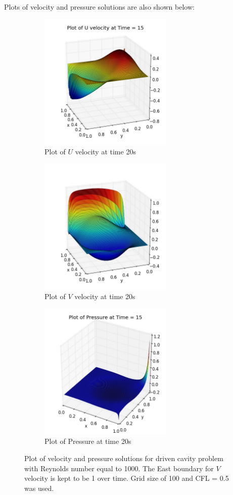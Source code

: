 Plots of velocity and pressure solutions are also shown below:
\begin{figure}[H]
	\centering
	\begin{subfigure}[t]{2.5in}
		\centering
		\includegraphics[width=2.5in]{figures/Gauge_dcv_uf_grid_120.jpg}
		\caption{Plot of $U$ velocity at time 20s}\label{fig:6.19a}		
	\end{subfigure}
	\quad
	\begin{subfigure}[t]{2.5in}
		\centering
		\includegraphics[width=2.5in]{figures/Gauge_dcv_vf_grid_120.jpg}
		\caption{Plot of $V$ velocity at time 20s}\label{fig:6.19b}
	\end{subfigure}
	\quad
	\centering
	\begin{subfigure}[t]{3.5in}
		\centering
		\includegraphics[width=2.5in]{figures/Gauge_dcv_pf_grid_120.jpg}
		\caption{Plot of Pressure at time 20s}\label{fig:6.19a}		
	\end{subfigure}
	\caption{Plot of velocity and pressure solutions for driven cavity problem with Reynolds number equal to 1000. The East boundary for $V$ velocity is kept to be 1 over time. Grid size of 100 and CFL = 0.5 was used.}\label{fig:6.16}
\end{figure}

